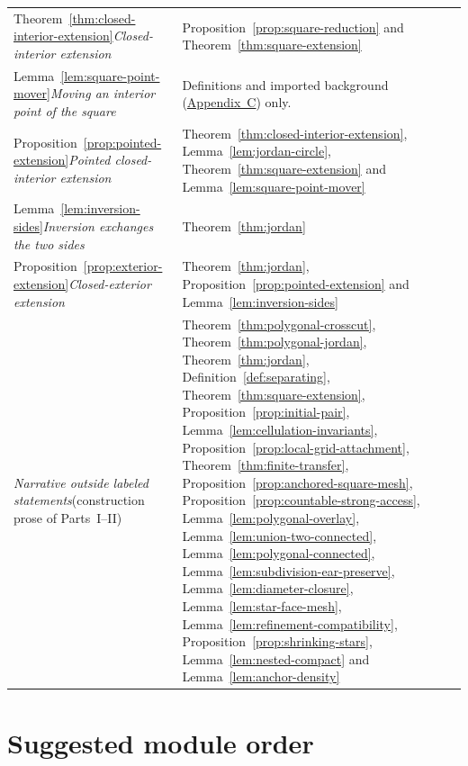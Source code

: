 \documentclass[11pt]{article}
\theoremstyle{mainplain}
\theoremstyle{mainroman}
\theoremstyle{definition}
\numberwithin{equation}{section}
\begin{document}
\begin{longtable}{@{}>{\raggedright\arraybackslash}p{}>{\raggedright\arraybackslash}p{}@{}}
Theorem~\ref{thm:closed-interior-extension}\newline\emph{Closed-interior extension} & Proposition~\ref{prop:square-reduction} and Theorem~\ref{thm:square-extension} \\
Lemma~\ref{lem:square-point-mover}\newline\emph{Moving an interior point of the square} & Definitions and imported background (\hyperref[app:background]{Appendix~C}) only. \\
Proposition~\ref{prop:pointed-extension}\newline\emph{Pointed closed-interior extension} & Theorem~\ref{thm:closed-interior-extension}, Lemma~\ref{lem:jordan-circle}, Theorem~\ref{thm:square-extension} and Lemma~\ref{lem:square-point-mover} \\
Lemma~\ref{lem:inversion-sides}\newline\emph{Inversion exchanges the two sides} & Theorem~\ref{thm:jordan} \\
Proposition~\ref{prop:exterior-extension}\newline\emph{Closed-exterior extension} & Theorem~\ref{thm:jordan}, Proposition~\ref{prop:pointed-extension} and Lemma~\ref{lem:inversion-sides} \\
\emph{Narrative outside labeled statements}\newline(construction prose of Parts~I--II) & Theorem~\ref{thm:polygonal-crosscut}, Theorem~\ref{thm:polygonal-jordan}, Theorem~\ref{thm:jordan}, Definition~\ref{def:separating}, Theorem~\ref{thm:square-extension}, Proposition~\ref{prop:initial-pair}, Lemma~\ref{lem:cellulation-invariants}, Proposition~\ref{prop:local-grid-attachment}, Theorem~\ref{thm:finite-transfer}, Proposition~\ref{prop:anchored-square-mesh}, Proposition~\ref{prop:countable-strong-access}, Lemma~\ref{lem:polygonal-overlay}, Lemma~\ref{lem:union-two-connected}, Lemma~\ref{lem:polygonal-connected}, Lemma~\ref{lem:subdivision-ear-preserve}, Lemma~\ref{lem:diameter-closure}, Lemma~\ref{lem:star-face-mesh}, Lemma~\ref{lem:refinement-compatibility}, Proposition~\ref{prop:shrinking-stars}, Lemma~\ref{lem:nested-compact} and Lemma~\ref{lem:anchor-density} \\
\end{longtable}

\section{Suggested module order}\label{app:module-order}
\end{document}
